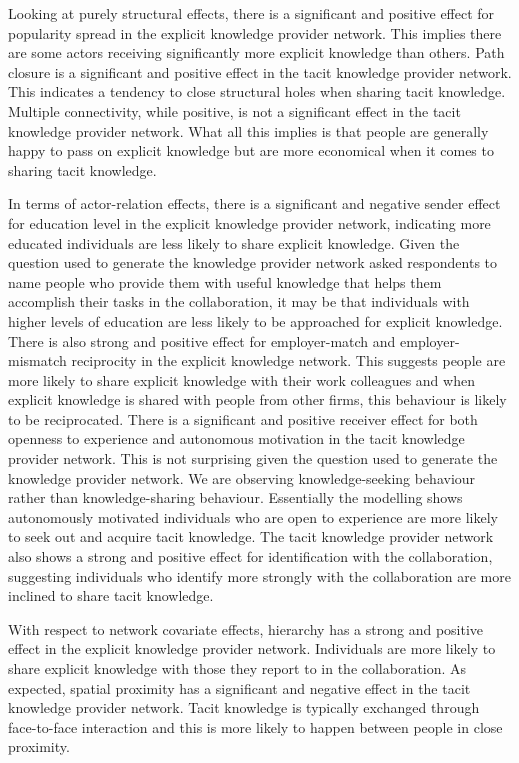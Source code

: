 Looking at purely structural effects, there is a significant and positive effect for popularity spread in the explicit knowledge provider network. This implies there are some actors receiving significantly more explicit knowledge than others. Path closure is a significant and positive effect in the tacit knowledge provider network. This indicates a tendency to close structural holes when sharing tacit knowledge. Multiple connectivity, while positive, is not a significant effect in the tacit knowledge provider network. What all this implies is that people are generally happy to pass on explicit knowledge but are more economical when it comes to sharing tacit knowledge.\medskip

In terms of actor-relation effects, there is a significant and negative sender effect for education level in the explicit knowledge provider network, indicating more educated individuals are less likely to share explicit knowledge. Given the question used to generate the knowledge provider network asked respondents to name people who provide them with useful knowledge that helps them accomplish their tasks in the collaboration, it may be that individuals with higher levels of education are less likely to be approached for explicit knowledge. There is also strong and positive effect for employer-match and employer-mismatch reciprocity in the explicit knowledge network. This suggests people are more likely to share explicit knowledge with their work colleagues and when explicit knowledge is shared with people from other firms, this behaviour is likely to be reciprocated. There is a significant and positive receiver effect for both openness to experience and autonomous motivation in the tacit knowledge provider network. This is not surprising given the question used to generate the knowledge provider network. We are observing knowledge-seeking behaviour rather than knowledge-sharing behaviour. Essentially the modelling shows autonomously motivated individuals who are open to experience are more likely to seek out and acquire tacit knowledge. The tacit knowledge provider network also shows a strong and positive effect for identification with the collaboration, suggesting individuals who identify more strongly with the collaboration are more inclined to share tacit knowledge.\medskip

With respect to network covariate effects, hierarchy has a strong and positive effect in the explicit knowledge provider network. Individuals are more likely to share explicit knowledge with those they report to in the collaboration. As expected, spatial proximity has a significant and negative effect in the tacit knowledge provider network. Tacit knowledge is typically exchanged through face-to-face interaction and this is more likely to happen between people in close proximity.\medskip

